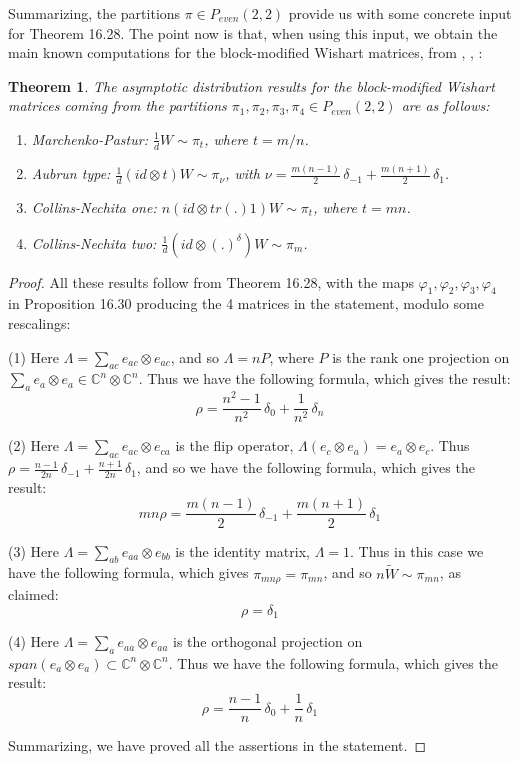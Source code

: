 \documentclass[12pt]{amsbook}
\newtheorem{theorem}{Theorem}[chapter]
\begin{document}
Summarizing, the partitions $\pi\in P_{even}(2,2)$ provide us with some concrete input for Theorem 16.28. The point now is that, when using this input, we obtain the main known computations for the block-modified Wishart matrices, from \cite{aub}, \cite{cne}, \cite{mpa}:

\begin{theorem}
The asymptotic distribution results for the block-modified Wishart matrices coming from the partitions $\pi_1,\pi_2,\pi_3,\pi_4\in P_{even}(2,2)$ are as follows:
\begin{enumerate}
\item Marchenko-Pastur: $\frac{1}{d}W\sim\pi_t$, where $t=m/n$.

\item Aubrun type: $\frac{1}{d}(id\otimes t)W\sim\pi_\nu$, with $\nu=\frac{m(n-1)}{2}\,\delta_{-1}+\frac{m(n+1)}{2}\,\delta_1$. 

\item Collins-Nechita one: $n(id\otimes tr(.)1)W\sim\pi_t$, where $t=mn$.

\item Collins-Nechita two: $\frac{1}{d}(id\otimes(.)^\delta)W\sim\pi_m$.
\end{enumerate}
\end{theorem}

\begin{proof}
All these results follow from Theorem 16.28, with the maps $\varphi_1,\varphi_2,\varphi_3,\varphi_4$ in Proposition 16.30 producing the 4 matrices in the statement, modulo some rescalings:

\medskip

(1) Here $\Lambda=\sum_{ac}e_{ac}\otimes e_{ac}$, and so $\Lambda=nP$, where $P$ is the rank one projection on $\sum_ae_a\otimes e_a\in\mathbb C^n\otimes\mathbb C^n$. Thus we have the following formula, which gives the result:
$$\rho=\frac{n^2-1}{n^2}\,\delta_0+\frac{1}{n^2}\,\delta_n$$

(2) Here $\Lambda=\sum_{ac}e_{ac}\otimes e_{ca}$ is the flip operator, $\Lambda(e_c\otimes e_a)=e_a\otimes e_c$. Thus $\rho=\frac{n-1}{2n}\,\delta_{-1}+\frac{n+1}{2n}\,\delta_1$, and so we have the following formula, which gives the result:
$$mn\rho=\frac{m(n-1)}{2}\,\delta_{-1}+\frac{m(n+1)}{2}\,\delta_1$$

(3) Here $\Lambda=\sum_{ab}e_{aa}\otimes e_{bb}$ is the identity matrix, $\Lambda=1$. Thus in this case we have the following formula, which gives $\pi_{mn\rho}=\pi_{mn}$, and so $n\widetilde{W}\sim\pi_{mn}$, as claimed:
$$\rho=\delta_1$$

(4) Here $\Lambda=\sum_ae_{aa}\otimes e_{aa}$ is the orthogonal projection on $span(e_a\otimes e_a)\subset\mathbb C^n\otimes\mathbb C^n$. Thus we have the following formula, which gives the result:
$$\rho=\frac{n-1}{n}\,\delta_0+\frac{1}{n}\,\delta_1$$

Summarizing, we have proved all the assertions in the statement.
\end{proof}
\end{document}
